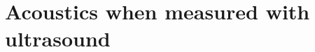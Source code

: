 \documentclass[10pt, fleqn,final,showtrims,oldfontcommands, article,a4paper,oneside]{memoir} %
\newcommand{\Poincare}{Poincar{\'e}\xspace}
\begin{document}











\section{Acoustics when measured with ultrasound}\label{sec:Maxwell}
\end{document}
